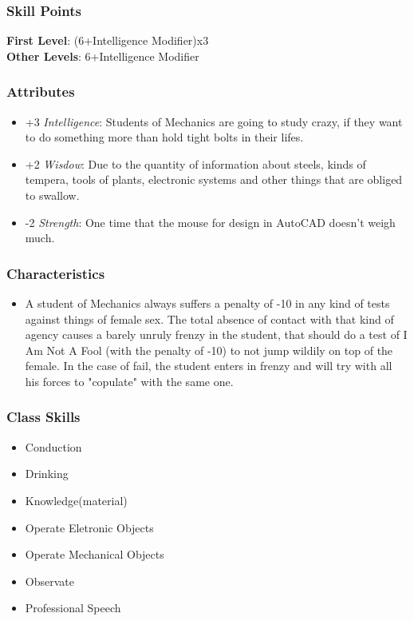 \documentclass[ letterpaper,12pt]{article}
\begin{document}
\subsubsection{Skill Points}
{\bf First Level}: (6+Intelligence Modifier)x3\\
{\bf Other Levels}: 6+Intelligence Modifier\\

\subsubsection{Attributes}
\begin{itemize}
\item{+3 {\it Intelligence}: Students  of Mechanics are going to study crazy, if they want to  do something more than  hold tight bolts in their lifes.}
\item{+2 {\it Wisdow}: Due  to the quantity of information about steels,  kinds  of   tempera,   tools  of plants,  electronic   systems  and  other things that  are  obliged to swallow.}
\item{-2 {\it Strength}: One  time that the  mouse  for  design  in  AutoCAD doesn't weigh much.}
\end{itemize}


\subsubsection{Characteristics}
\begin{itemize}
\item{A  student  of Mechanics always suffers a penalty of  -10  in  any  kind  of  tests against things of female sex.  The  total absence  of  contact  with  that  kind of agency causes a  barely unruly  frenzy in the  student,  that  should  do a test of I Am Not A Fool (with the penalty of -10) to not jump wildily on top of the female. In the  case  of fail, the student enters in  frenzy  and  will  try  with  all his forces to "copulate" with the same one.}
\end{itemize}

\subsubsection{Class Skills}
\begin{itemize}
\item{Conduction}
\item{Drinking}
\item{Knowledge(material)}
\item{Operate Eletronic Objects}
\item{Operate Mechanical Objects}
\item{Observate}
\item{Professional Speech}
\end{itemize}
\end{document}
